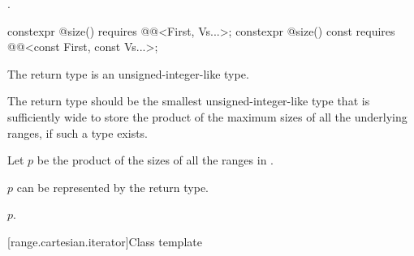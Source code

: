 \begin{itemdescr}
\pnum
\returns
{}.
\end{itemdescr}

\begin{itemdecl}
constexpr @\seebelow@ size()
  requires @@<First, Vs...>;
constexpr @\seebelow@ size() const
  requires @@<const First, const Vs...>;
\end{itemdecl}

\begin{itemdescr}
\pnum
The return type is an  unsigned-integer-like type.

\pnum
\recommended
The return type should be the smallest unsigned-integer-like type
that is sufficiently wide to store the product of the maximum sizes of
all the underlying ranges, if such a type exists.

\pnum
Let $p$ be the product of the sizes of all the ranges in .

\pnum
\expects
$p$ can be represented by the return type.

\pnum
\returns
$p$.
\end{itemdescr}

[range.cartesian.iterator]{Class template }

